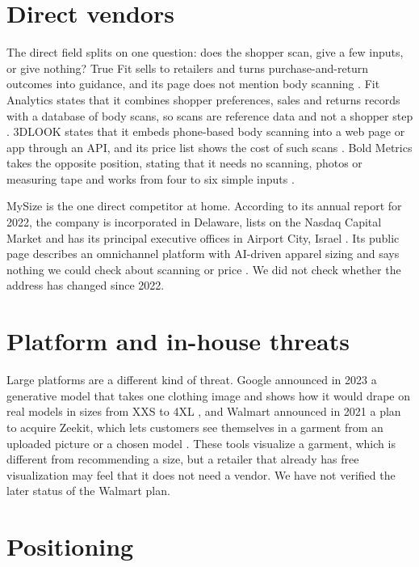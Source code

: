 \section{Direct vendors}\label{sec:comp-direct}

The direct field splits on one question: does the shopper scan, give a few inputs, or give nothing? True Fit sells to retailers and turns purchase-and-return outcomes into guidance, and its page does not mention body scanning \cite{truefit_web}. Fit Analytics states that it combines shopper preferences, sales and returns records with a database of body scans, so scans are reference data and not a shopper step \cite{fitanalytics_web}. 3DLOOK states that it embeds phone-based body scanning into a web page or app through an API, and its price list shows the cost of such scans \cite{threedlook_web,threedlook_pricing}. Bold Metrics takes the opposite position, stating that it needs no scanning, photos or measuring tape and works from four to six simple inputs \cite{boldmetrics_web}.

MySize is the one direct competitor at home. According to its annual report for 2022, the company is incorporated in Delaware, lists on the Nasdaq Capital Market and has its principal executive offices in Airport City, Israel \cite{mysize10k2022}. Its public page describes an omnichannel platform with AI-driven apparel sizing and says nothing we could check about scanning or price \cite{mysize_web}. We did not check whether the address has changed since 2022.

\section{Platform and in-house threats}\label{sec:comp-platform}

Large platforms are a different kind of threat. Google announced in 2023 a generative model that takes one clothing image and shows how it would drape on real models in sizes from XXS to 4XL \cite{google2023tryon}, and Walmart announced in 2021 a plan to acquire Zeekit, which lets customers see themselves in a garment from an uploaded picture or a chosen model \cite{walmart2021zeekit}. These tools visualize a garment, which is different from recommending a size, but a retailer that already has free visualization may feel that it does not need a vendor. We have not verified the later status of the Walmart plan.

\section{Positioning}\label{sec:comp-position}

